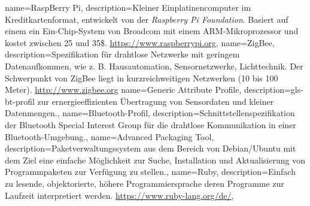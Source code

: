 {
  name={RaspBerry Pi},
  description={Kleiner Einplatinencomputer im Kreditkartenformat, entwickelt von
    der \emph{Raspberry Pi Foundation}.	Basiert auf einem ein Ein-Chip-System von Broadcom
    mit einem ARM-Mikroprozessor und kostet zwischen 25 und 35\$.
    \newline\url{https://www.raspberrypi.org}},
}
{
  name={ZigBee},
  description={Spezifikation für drahtlose Netzwerke mit geringem Datenaufkommen,
    wie z. B. Hausautomation, Sensornetzwerke, Lichttechnik. Der Schwerpunkt von
    ZigBee liegt in kurzreichweitigen Netzwerken (10 bis 100 Meter).
    \newline \url{http://www.zigbee.org}}
}
{
  name={Generic Attribute Profile},
  description={\gls{gls-bt-profil} zur ernergieeffizienten Übertragung von Sensordaten und kleiner
    Datenmengen.},
}
{
  name={Bluetooth-Profil},
  description={Schnittstellenspezifikation der Bluetooth Special Interest Group für die drahtlose
    Kommunikation in einer Bluetooth-Umgebung.},
}
{
  name={Advanced Packaging Tool},
  description={Paketverwaltungssystem aus dem Bereich von Debian/Ubuntu mit dem Ziel
    eine einfache Möglichkeit zur Suche, Installation und Aktualisierung von Programmpaketen
    zur Verfügung zu stellen.},
}
{
  name={Ruby},
  description={Einfach zu lesende, objektorierte, höhere Programmiersprache deren Programme
    zur Laufzeit interpretiert werden.
    \newline\url{https://www.ruby-lang.org/de/}},
}

